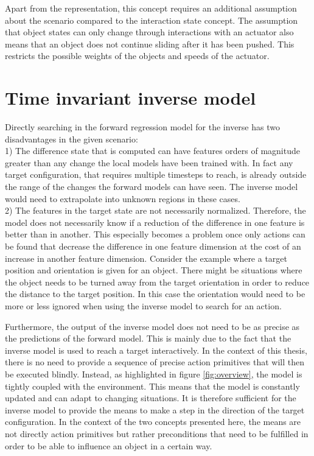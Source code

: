 Apart from the representation, this concept requires an additional assumption about the scenario compared to the interaction state concept. The assumption that object states can only change through interactions with an actuator also means that an object does not continue sliding after it has been pushed. This restricts the possible weights of the objects and speeds of the actuator.

\section{Time invariant inverse model \label{sec:invModel}}

Directly searching in the forward regression model for the inverse has two disadvantages in the given scenario: \\
1) The difference state that is computed can have features orders of magnitude greater than any change the local models have been trained with. In fact any target configuration, that requires multiple timesteps to reach, is already outside the range of the changes the forward models can have seen. 
The inverse model would need to extrapolate into unknown regions in these cases. \\
2) The features in the target state are not necessarily normalized. Therefore, the model does not necessarily know if a reduction of the difference in one feature is better than in another. This especially becomes a problem once only actions can be found that decrease the difference in one feature dimension at the cost of an increase in another feature dimension. Consider the example where a target position and orientation is given for an object. There might be situations where the object needs to be turned away from the target orientation in order to reduce the distance to the target position. In this case the orientation would need to be more or less ignored when using the inverse model to search for an action.

Furthermore, the output of the inverse model does not need to be as precise as the predictions of the forward model. This is mainly due to the fact that the inverse model is used to reach a target interactively. In the context of this thesis, there is no need to provide a sequence of precise action primitives that will then be executed blindly. Instead, as highlighted in figure \ref{fig:overview}, the model is tightly coupled with the environment. This means that the model is constantly updated and can adapt to changing situations. It is therefore sufficient for the inverse model to provide the means to make a step in the direction of the target configuration. In the context of the two concepts presented here, the means are not directly action primitives but rather preconditions that need to be fulfilled in order to be able to influence an object in a certain way.

